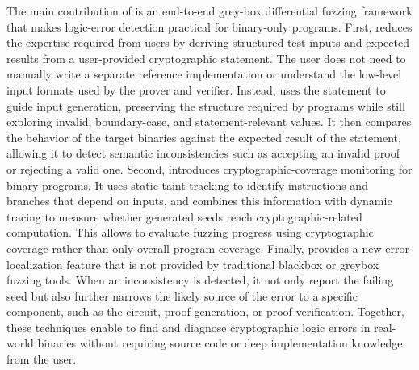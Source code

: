 The main contribution of \greyboxfuzz is an end-to-end grey-box differential fuzzing framework that makes \zksnark logic-error detection practical for binary-only programs. First, \greyboxfuzz reduces the expertise required from users by deriving structured test inputs and expected results from a user-provided cryptographic statement. The user does not need to manually write a separate reference implementation or understand the low-level input formats used by the prover and verifier. Instead, \greyboxfuzz uses the statement to guide input generation, preserving the structure required by \zksnark programs while still exploring invalid, boundary-case, and statement-relevant values. It then compares the behavior of the target binaries against the expected result of the statement, allowing it to detect semantic inconsistencies such as accepting an invalid proof or rejecting a valid one. Second, \greyboxfuzz introduces cryptographic-coverage monitoring for binary programs. It uses static taint tracking to identify instructions and branches that depend on \zksnark inputs, and combines this information with dynamic tracing to measure whether generated seeds reach cryptographic-related computation. This allows \greyboxfuzz to evaluate fuzzing progress using cryptographic coverage rather than only overall program coverage. Finally, \greyboxfuzz provides a new error-localization feature that is not provided by traditional blackbox or greybox fuzzing tools. When an inconsistency is detected, it not only report the failing seed but also further narrows the likely source of the error to a specific component, such as the circuit, proof generation, or proof verification. Together, these techniques enable \greyboxfuzz to find and diagnose cryptographic logic errors in real-world \zksnark binaries without requiring source code or deep implementation knowledge from the user.


